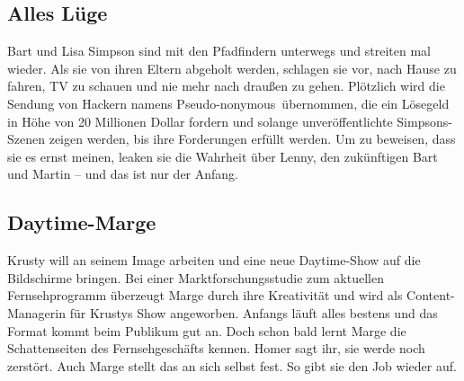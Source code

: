 
\subsection{Alles Lüge}
Bart und Lisa Simpson sind mit den Pfadfindern unterwegs und streiten mal wieder. Als sie von ihren Eltern abgeholt werden, schlagen sie vor, nach Hause zu fahren, TV zu schauen und nie mehr nach draußen zu gehen. Plötzlich wird die Sendung von Hackern namens \glqq Pseudo-nonymous\grqq\ übernommen, die ein Lösegeld in Höhe von 20 Millionen Dollar fordern und solange unveröffentlichte Simpsons-Szenen zeigen werden, bis ihre Forderungen erfüllt werden. Um zu beweisen, dass sie es ernst meinen, leaken sie die Wahrheit über Lenny, den zukünftigen Bart und Martin -- und das ist nur der Anfang.


\subsection{Daytime-Marge}
Krusty will an seinem Image arbeiten und eine neue Daytime-Show auf die Bildschirme bringen. Bei einer Marktforschungsstudie zum aktuellen Fernsehprogramm überzeugt Marge durch ihre Kreativität und wird als Content-Managerin für Krustys Show angeworben. Anfangs läuft alles bestens und das Format kommt beim Publikum gut an. Doch schon bald lernt Marge die Schattenseiten des Fernsehgeschäfts kennen. Homer sagt ihr, sie werde noch zerstört. Auch Marge stellt das an sich selbst fest. So gibt sie den Job wieder auf.

